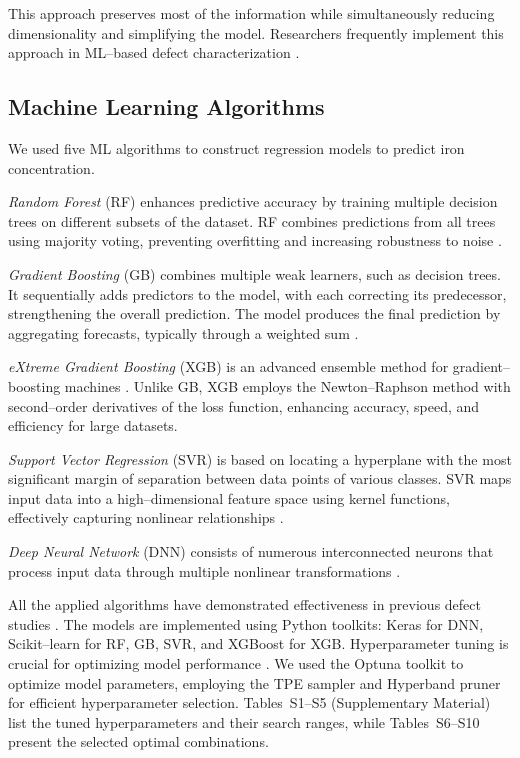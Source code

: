 \documentclass[a4paper,fleqn]{cas-sc}
\begin{document}
This approach preserves most of the information while simultaneously reducing dimensionality and simplifying the model. 
Researchers frequently implement this approach in ML--based defect characterization \cite{Ma2025, Chia2024}.

\subsection{Machine Learning Algorithms}
\par
We used five ML algorithms to construct regression models to predict iron concentration.


\textit{Random Forest} (RF) enhances predictive accuracy by training multiple decision trees on different subsets of the dataset. 
RF combines predictions from all trees using majority voting, preventing overfitting and increasing robustness to noise \cite{Breiman2001}.


\textit{Gradient Boosting} (GB) combines multiple weak learners, such as decision trees. 
It sequentially adds predictors to the model, with each correcting its predecessor, strengthening the overall prediction.
The model produces the final prediction by aggregating forecasts, typically through a weighted sum \cite{Natekin2013}.


\textit{eXtreme Gradient Boosting} (XGB) is an advanced ensemble method for gradient--boosting machines \cite{Akinpelu2024}. 
Unlike GB, XGB employs the Newton--Raphson method with second--order derivatives of the loss function, enhancing accuracy, speed, and efficiency for large datasets.


\textit{Support Vector Regression} (SVR) is based on locating a hyperplane with the most significant margin of separation between data points of various classes. 
SVR maps input data into a high--dimensional feature space using kernel functions, effectively capturing nonlinear relationships \cite{Cao2020}.


\textit{Deep Neural Network} (DNN) consists of numerous interconnected neurons that process input data through multiple nonlinear transformations \cite{Liu2023}.


All the applied algorithms have demonstrated effectiveness in previous defect studies \cite{Buratti2020a, Buratti2022, Olikh2022PPV, Buratti2024}. 
The models are implemented using Python toolkits: Keras for DNN, Scikit--learn for RF, GB, SVR, and XGBoost for XGB. 
Hyperparameter tuning is crucial for optimizing model performance \cite{Hanif2024}. 
We used the Optuna toolkit to optimize model parameters, employing the TPE sampler and Hyperband pruner for efficient hyperparameter selection. 
Tables~S1–S5 (Supplementary Material) list the tuned hyperparameters and their search ranges, while Tables~S6–S10 present the selected optimal combinations.
\end{document}
